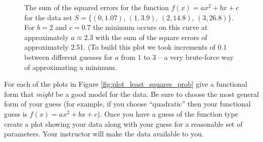 \begin{figure}
    \begin{center}
    \end{center}
    \caption{The sum of the squared errors for the function $f(x) = ax^2 + bx + c$ for the
    data set $S = \{ (0,1.07), \, (1,3.9), \, (2,14.8), \, (3,26.8)\}$. For $b=2$ and
$c=0.7$ the minimum occurs on this curve at approximately $a \approx 2.3$ with the sum of
the square errors of approximately 2.51. (To build this plot we took increments of $0.1$
between different guesses for $a$ from $1$ to $3$ -- a very brute-force way of
approximating a minimum.}
    \label{fig:least_squares_ex_error_plot}
\end{figure}


\begin{problem}\label{prob:least_squares_plots}
    For each of the plots in Figure \ref{fig:plot_least_squares_prob} give a functional
    form that {\it might} be a good model for the data.  Be sure to choose the most
    general form of your guess (for example, if you choose ``quadratic'' then your
    functional guess is $f(x) = ax^2 + bx + c$).  Once you have a guess of the function
    type create a plot showing your data along with your guess for a reasonable set of
    parameters. Your instructor will make the data available to you.
\end{problem}


